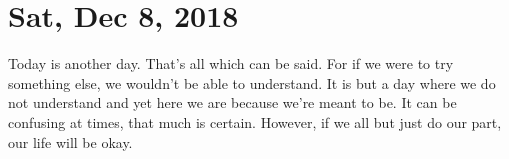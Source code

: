 \section{Sat, Dec 8, 2018}

Today is another day. That's all which can be said. For if we were to try something 
else, we wouldn't be able to understand. It is but a day where we do not understand
and yet here we are because we're meant to be. It can be confusing at times, that
much is certain. However, if we all but just do our part, our life will be okay.